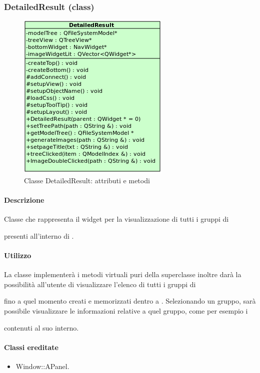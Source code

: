 \subsubsection{DetailedResult (class)}
\label{spedetRe}
\begin{figure}[!h]
\centering
			\includegraphics[width=0.5\linewidth]{./Content/Immagini/view/DetailedResult.png}
			\caption{Classe DetailedResult: attributi e metodi}
			\label{cl_detRes}
\end{figure}
\paragraph{Descrizione \\}
Classe che rappresenta il widget per la visualizzazione di tutti i gruppi di \subject{} presenti all'interno di \project.
\paragraph{Utilizzo\\}
La classe implementerà i metodi virtuali puri della superclasse inoltre darà la possibilità all'utente di visualizzare l'elenco di tutti i gruppi di \subject{} fino a quel momento creati e memorizzati dentro a \project. Selezionando un gruppo, sarà possibile visualizzare le informazioni relative a quel gruppo, come per esempio i \subject{} contenuti al suo interno.
\paragraph{Classi ereditate\\}
\begin{itemize}
\item Window::APanel.
\end{itemize}
